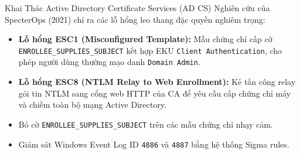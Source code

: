 \begin{frame}{Khai Thác Active Directory Certificate Services (AD CS)}
  Nghiên cứu của SpecterOps (2021) chỉ ra các lỗ hổng leo thang đặc quyền nghiêm trọng:
  \begin{itemize}\small
    \item \textbf{Lỗ hổng ESC1 (Misconfigured Template):} Mẫu chứng chỉ cấp cờ \texttt{ENROLLEE\_SUPPLIES\_SUBJECT} kết hợp EKU \texttt{Client Authentication}, cho phép người dùng thường mạo danh \texttt{Domain Admin}.
    \item \textbf{Lỗ hổng ESC8 (NTLM Relay to Web Enrollment):} Kẻ tấn công relay gói tin NTLM sang cổng web HTTP của CA để yêu cầu cấp chứng chỉ máy và chiếm toàn bộ mạng Active Directory.
  \end{itemize}

  \begin{quizbox}
    \begin{itemize}\small
      \item Bỏ cờ \texttt{ENROLLEE\_SUPPLIES\_SUBJECT} trên các mẫu chứng chỉ nhạy cảm.
      \item Giám sát Windows Event Log ID \texttt{4886} và \texttt{4887} bằng hệ thống Sigma rules.
    \end{itemize}
  \end{quizbox}
\end{frame}

